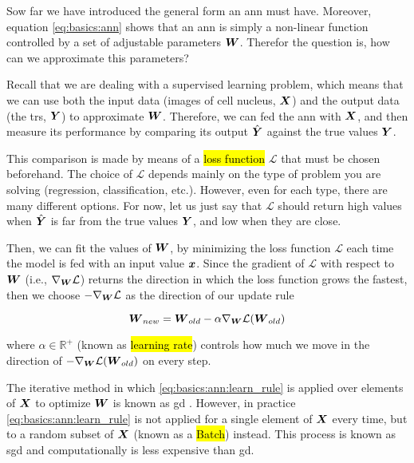 Sow far we have introduced the general form an \gls{ann} must have. Moreover, equation \ref{eq:basics:ann} shows that an \gls{ann} is simply a non-linear function controlled by a set of adjustable parameters $\boldsymbol{W}$. Therefor the question is, how can we approximate this parameters?

Recall that we are dealing with a supervised learning problem, which means that we can use both the input data (images of cell nucleus, $\boldsymbol{X}$) and the output data (the \glspl{tr}, $\boldsymbol{Y}$) to approximate $\boldsymbol{W}$. Therefore, we can fed the \gls{ann} with $\boldsymbol{X}$, and then measure its performance by comparing its output $\hat{\boldsymbol{Y}}$ against the true values $\boldsymbol{Y}$.

This comparison is made by means of a \hl{loss function} $\mathcal{L}$ that must be chosen beforehand. The choice of $\mathcal{L}$ depends mainly on the type of problem you are solving (regression, classification, etc.). However, even for each type, there are many different options. For now, let us just say that $\mathcal{L}$ should return high values when $\hat{\boldsymbol{Y}}$ is far from the true values $\boldsymbol{Y}$, and low when they are close.

Then, we can fit the values of $\boldsymbol{W}$, by minimizing the loss function $\mathcal{L}$ each time the model is fed with an input value $\boldsymbol{x}$. Since the gradient of $\mathcal{L}$ with respect to $\boldsymbol{W}$ (i.e., $ \nabla_{\boldsymbol{W}} \mathcal{L}$) returns the direction in which the loss function grows the fastest, then we choose $- \nabla_{\boldsymbol{W}} \mathcal{L}$ as the direction of our update rule

\begin{equation}
  \boldsymbol{W}_{new} = \boldsymbol{W}_{old} - \alpha \nabla_{\boldsymbol{W}} \mathcal{L}(\boldsymbol{W}_{old})
  \label{eq:basics:ann:learn_rule}
\end{equation}

\noindent where $\alpha \in \mathbb{R}^+$ (known as \hl{learning rate}) controls how much we move in the direction of $-\nabla_{\boldsymbol{W}} \mathcal{L}(\boldsymbol{W}_{old})$ on every step.

The iterative method in which \ref{eq:basics:ann:learn_rule} is applied over elements of $\boldsymbol{X}$ to optimize $\boldsymbol{W}$ is known as \gls{gd} \cite{bishop2006pattern}. However, in practice \ref{eq:basics:ann:learn_rule} is not applied for a single element of $\boldsymbol{X}$ every time, but to a random subset of $\boldsymbol{X}$ (known as a \hl{Batch}) instead. This process is known as \gls{sgd} and computationally is less  expensive than \gls{gd}.

